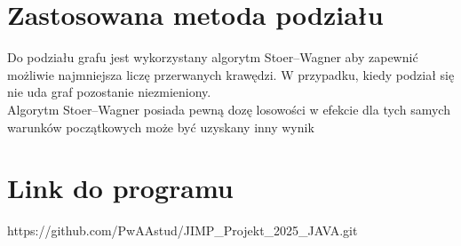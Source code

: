 \documentclass{article}
\begin{document}
\section{Zastosowana metoda podziału}
Do podziału grafu jest wykorzystany algorytm Stoer–Wagner aby zapewnić możliwie najmniejsza liczę przerwanych krawędzi. W przypadku, kiedy podział się nie uda graf pozostanie niezmieniony. \\
Algorytm Stoer–Wagner posiada pewną dozę losowości w efekcie dla tych samych warunków początkowych może być uzyskany inny wynik
\section{Link do programu}
https://github.com/PwAAstud/JIMP\_Projekt\_2025\_JAVA.git
\end{document}
